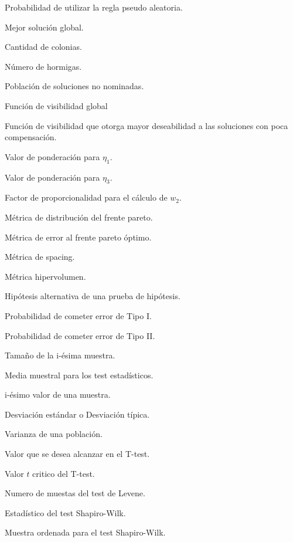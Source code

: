 \begin{Nomencl}[2em]
\item[$q_o        $] Probabilidad de utilizar la regla pseudo aleatoria.
\item[$gb        $] Mejor soluci\'on global.
\item[$b        $] Cantidad de colonias.
\item[$l        $] N\'umero de hormigas.
\item[$P        $] Poblaci\'on de soluciones no nominadas.
\item[$\eta        $] Funci\'on de visibilidad global
\item[$\eta_1        $] Funci\'on de visibilidad que otorga mayor deseabilidad a las soluciones con
    poca compensaci\'on.
\item[$w_1        $] Valor de ponderaci\'on para $\eta_1$.
\item[$w_3        $] Valor de ponderaci\'on para $\eta_3$.
\item[$f_b        $] Factor de proporcionalidad para el c\'alculo de $w_2$.
\item[$M_2        $] M\'etrica de distribuci\'on del frente pareto.
\item[$M_4        $] M\'etrica de error al frente pareto \'optimo.
\item[$SP        $] M\'etrica de spacing.
\item[$HV        $] M\'etrica hipervolumen.
\item[$H_1        $] Hip\'otesis alternativa de una prueba de hip\'otesis.
\item[$\alpha-error        $] Probabilidad de cometer error de Tipo I.
\item[$\beta-error        $] Probabilidad de cometer error de Tipo II.
\item[$n_i        $] Tama\~no de la i-\'esima muestra.
\item[$\bar{x}        $] Media muestral para los test estad\'isticos.
\item[${x(i)}        $] i-\'esimo valor de una muestra.
\item[$\sigma        $] Desviaci\'on est\'andar o Desviaci\'on t\'ipica.
\item[$\sigma^2        $] Varianza de una poblaci\'on.
\item[$\mu        $] Valor que se desea alcanzar en el T-test.
\item[$t_c        $] Valor $t$ critico del T-test.
\item[$d        $] Numero de muestas del test de Levene.
\item[$W,p        $] Estad\'istico del test Shapiro-Wilk.
\item[$Y_{(n)}        $] Muestra ordenada para el test Shapiro-Wilk.

\end{Nomencl}
